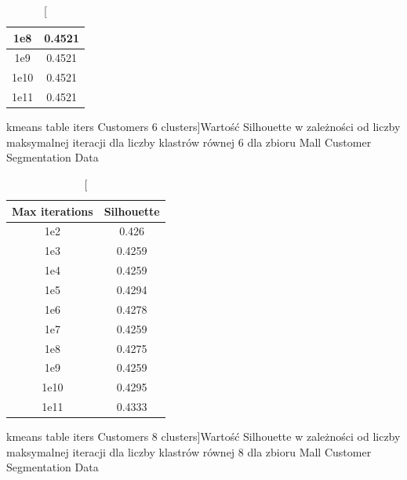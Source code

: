 \documentclass{classrep}
\begin{document}
{{\begin{table}[!htbp]
\begin{minipage}{.48\textwidth}
\begin{tabular}{|c|c|}
                        1e8 & 0.4521 \\ \hline
                        1e9 & 0.4521 \\ \hline
                        1e10 & 0.4521 \\ \hline
                        1e11 & 0.4521 \\ \hline
                    \end{tabular}
                    \caption
                    [kmeans table iters Customers 6 clusters]{Wartość Silhouette w
                    zależności od liczby maksymalnej iteracji dla liczby klastrów
                    równej 6 dla zbioru Mall Customer Segmentation Data}
                    \label{kmeans_table_iters_Customers_6_clusters}
                \end{minipage}
                \hfill
            \end{table}
            \FloatBarrier
            \begin{table}[!htbp]
                \begin{minipage}{.48\textwidth}
                    \centering
                    \begin{tabular}{|c|c|}
                        \hline
                        Max iterations & Silhouette \\ \hline
                        1e2 & 0.426 \\ \hline
                        1e3 & 0.4259 \\ \hline
                        1e4 & 0.4259 \\ \hline
                        1e5 & 0.4294 \\ \hline
                        1e6 & 0.4278 \\ \hline
                        1e7 & 0.4259 \\ \hline
                        1e8 & 0.4275 \\ \hline
                        1e9 & 0.4259 \\ \hline
                        1e10 & 0.4295 \\ \hline
                        1e11 & 0.4333 \\ \hline
                    \end{tabular}
                    \caption
                    [kmeans table iters Customers 8 clusters]{Wartość Silhouette w
                    zależności od liczby maksymalnej iteracji dla liczby klastrów
                    równej 8 dla zbioru Mall Customer Segmentation Data}
                    \label{kmeans_table_iters_Customers_8_clusters}

\end{minipage}
\end{table}}}
\end{document}
